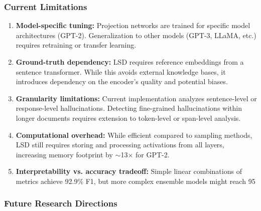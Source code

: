 \documentclass[11pt]{article}
\begin{document}
\subsubsection{Current Limitations}

\begin{enumerate}[leftmargin=*]
    \item \textbf{Model-specific tuning:} Projection networks are trained for specific model architectures (GPT-2). Generalization to other models (GPT-3, LLaMA, etc.) requires retraining or transfer learning.
    
    \item \textbf{Ground-truth dependency:} LSD requires reference embeddings from a sentence transformer. While this avoids external knowledge bases, it introduces dependency on the encoder's quality and potential biases.
    
    \item \textbf{Granularity limitations:} Current implementation analyzes sentence-level or response-level hallucinations. Detecting fine-grained hallucinations within longer documents requires extension to token-level or span-level analysis.
    
    \item \textbf{Computational overhead:} While efficient compared to sampling methods, LSD still requires storing and processing activations from all layers, increasing memory footprint by $\sim$13$\times$ for GPT-2.
    
    \item \textbf{Interpretability vs. accuracy tradeoff:} Simple linear combinations of metrics achieve 92.9\% F1, but more complex ensemble models might reach 95%
\end{enumerate}

\subsubsection{Future Research Directions}
\end{document}
